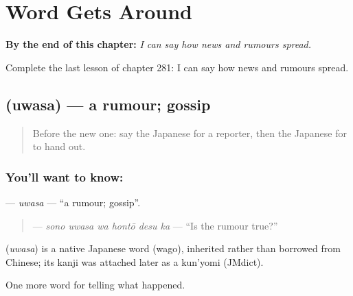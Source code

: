 
\chapter{Word Gets Around}
\label{ch:ja-word-gets-around}

\begin{chapteropening}
\textbf{By the end of this chapter:} \emph{I can say how news and rumours spread.}

Complete the last lesson of chapter 281: I can say how news and rumours spread.
\end{chapteropening}

\section[\texorpdfstring{\ja{うわさ} (uwasa)}{うわさ (uwasa)}]{ (uwasa) — a rumour; gossip}

\label{lesson:JA-C281-uwasa}



\begin{quote}
Before the new one: say the Japanese for a reporter, then the Japanese for to hand out.
\end{quote}

\subsection*{You'll want to know: }
\textbf{} — \emph{uwasa} — \textquotedblleft{}a rumour; gossip\textquotedblright{}.

\begin{quote}
\textbf{  } — \emph{sono uwasa wa hontō desu ka} — \textquotedblleft{}Is the rumour true?\textquotedblright{}
\end{quote}

\begin{cousinweb}
\textbf{} (\emph{uwasa}) is a native Japanese word (wago), inherited rather than borrowed from Chinese; its kanji was attached later as a kun'yomi (JMdict).
\end{cousinweb}

\begin{grammarlens}[title={What you've built}]
One more word for telling what happened.
\end{grammarlens}

